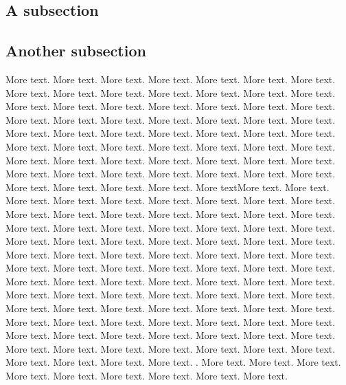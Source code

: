 \documentclass[12pt]{article} %
\begin{document}
\subsection{A subsection}\vspace{-1ex}\titlerule[1pt]\bigskip

\cite{stevenson1982formation}



\subsection{Another subsection}\vspace{-1ex}\titlerule[1pt]\bigskip

More text.
More text.
More text.
More text.
More text.
More text.
More text.
More text.
More text.
More text.
More text.
More text.
More text.
More text.
More text.
More text.
More text.
More text.
More text.
More text.
More text.
More text.
More text.
More text.
More text.
More text.
More text.
More text.
More text.
More text.
More text.
More text.
More text.
More text.
More text.
More text.
More text.
More text.
More text.
More text.
More text.
More text.
More text.
More text.
More text.
More text.
More text.
More text.
More text.
More text.
More text.
More text.
More text.
More text.
More text.
More text.
More text.
More text.
More text.
More text.
More textMore text.
More text.
More text.
More text.
More text.
More text.
More text.
More text.
More text.
More text.
More text.
More text.
More text.
More text.
More text.
More text.
More text.
More text.
More text.
More text.
More text.
More text.
More text.
More text.
More text.
More text.
More text.
More text.
More text.
More text.
More text.
More text.
More text.
More text.
More text.
More text.
More text.
More text.
More text.
More text.
More text.
More text.
More text.
More text.
More text.
More text.
More text.
More text.
More text.
More text.
More text.
More text.
More text.
More text.
More text.
More text.
More text.
More text.
More text.
More text.
More text.
More text.
More text.
More text.
More text.
More text.
More text.
More text.
More text.
More text.
More text.
More text.
More text.
More text.
More text.
More text.
More text.
More text.
More text.
More text.
More text.
More text.
More text.
More text.
More text.
More text.
More text.
More text.
More text.
More text.
.
More text.
More text.
More text.
More text.
More text.
More text.
More text.
More text.
More text.

\newpage

\end{document}
